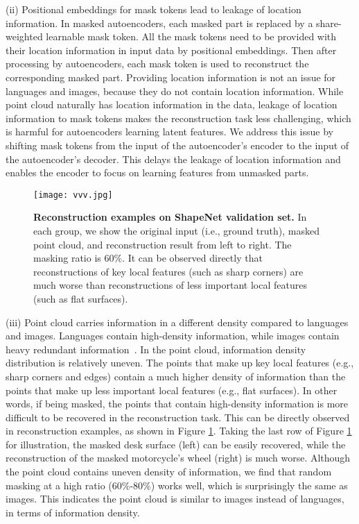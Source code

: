 \documentclass[runningheads]{llncs}
\begin{document}
(ii) Positional embeddings for mask tokens lead to leakage of location information. In masked autoencoders, each masked part is replaced by a share-weighted learnable mask token. All the mask tokens need to be provided with their location information in input data by positional embeddings. Then after processing by autoencoders, each mask token is used to reconstruct the corresponding masked part. Providing location information is not an issue for languages and images, because they do not contain location information. While point cloud naturally has location information in the data, leakage of location information to mask tokens makes the reconstruction task less challenging, which is harmful for autoencoders learning latent features. We address this issue by shifting mask tokens from the input of the autoencoder's encoder to the input of the autoencoder's decoder. This delays the leakage of location information and enables the encoder to focus on learning features from unmasked parts. 

\begin{figure}
    \centering
    \texttt{[image: vvv.jpg]}
    \caption{{\bf Reconstruction examples on ShapeNet validation set.} In each group, we show the original input (i.e., ground truth), masked point cloud, and reconstruction result from left to right. The masking ratio is 60\%. It can be observed directly that reconstructions of key local features (such as sharp corners) are much worse than reconstructions of less important local features (such as flat surfaces).}
    \label{fig:vis1}
\end{figure}

(iii) Point cloud carries information in a different density compared to languages and images. Languages contain high-density information, while images contain heavy redundant information~\cite{mae}. In the point cloud, information density distribution is relatively uneven. The points that make up key local features (e.g., sharp corners and edges) contain a much higher density of information than the points that make up less important local features (e.g., flat surfaces). In other words, if being masked, the points that contain high-density information is more difficult to be recovered in the reconstruction task. This can be directly observed in reconstruction examples, as shown in Figure \ref{fig:vis1}. Taking the last row of Figure \ref{fig:vis1} for illustration, the masked desk surface (left) can be easily recovered, while the reconstruction of the masked motorcycle's wheel (right) is much worse. Although the point cloud contains uneven density of information, we find that random masking at a high ratio (60\%-80\%) works well, which is surprisingly the same as images. This indicates the point cloud is similar to images instead of languages, in terms of information density.
\end{document}
